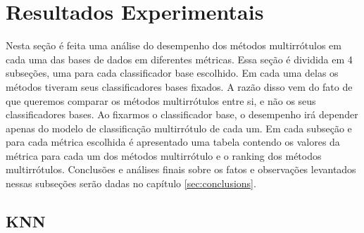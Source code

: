 

% 


\section{Resultados Experimentais}
\label{sec:exps}
Nesta seção é feita uma análise do desempenho dos métodos multirrótulos em cada uma das bases de dados
em diferentes métricas.
Essa seção é dividida em 4 subseções, uma para cada classificador base escolhido. Em cada uma
delas os métodos tiveram seus classificadores bases fixados.
A razão disso vem do fato de que queremos comparar os métodos multirrótulos entre si, e não os seus classificadores
bases.
Ao fixarmos o classificador base, 
o desempenho irá depender apenas do modelo de classificação multirrótulo
de cada um.
Em cada subseção e para cada métrica escolhida é apresentado uma tabela
contendo os valores da métrica para cada um dos métodos multirrótulo e
o ranking dos métodos multirrótulos. Conclusões e análises finais sobre
os fatos e observações levantados nessas subseções serão
dadas no capítulo \ref{sec:conclusions}.


% 
% 

\subsection{KNN}





